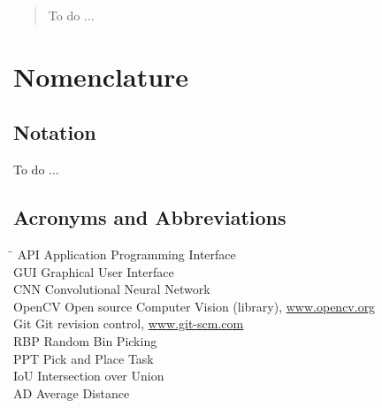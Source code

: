 \begin{abstract}
To do ... 
\end{abstract}

\chapter*{Nomenclature}\label{ch:symbols}

\section*{Notation}
\label{sec:notation}

To do ...

\section*{Acronyms and Abbreviations}
\label{sec:acronyms}

\begin{tabbing}
	\hspace*{3.5cm}		\= \kill
	API \> Application Programming Interface \\[1ex]
	GUI \> Graphical User Interface \\[1ex]
	CNN \> Convolutional Neural Network\\[1ex]
	OpenCV  \> Open source Computer Vision (library), \url{www.opencv.org} \\[1ex]
	Git  \> Git revision control, \url{www.git-scm.com} \\[1ex]
	RBP  \> Random Bin Picking \\[1ex]
	PPT  \> Pick and Place Task \\[1ex]
	IoU  \> Intersection over Union \\[1ex]
	AD  \> Average Distance \\[1ex]
\end{tabbing}